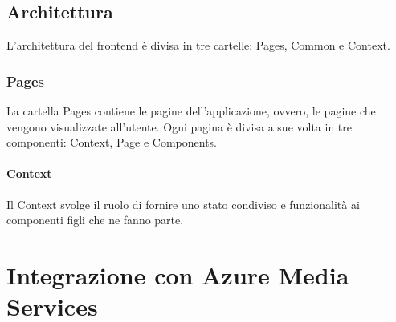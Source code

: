 \subsection{Architettura}
L'architettura del frontend è divisa in tre cartelle: Pages, Common e Context.

\subsubsection{Pages}
La cartella Pages contiene le pagine dell'applicazione, ovvero, le pagine che vengono visualizzate all'utente. Ogni pagina è divisa a sue volta in tre componenti: Context, Page e Components.\\

\paragraph{Context}
Il Context svolge il ruolo di fornire uno stato condiviso e funzionalità ai componenti figli che ne fanno parte.


\section{Integrazione con Azure Media Services}